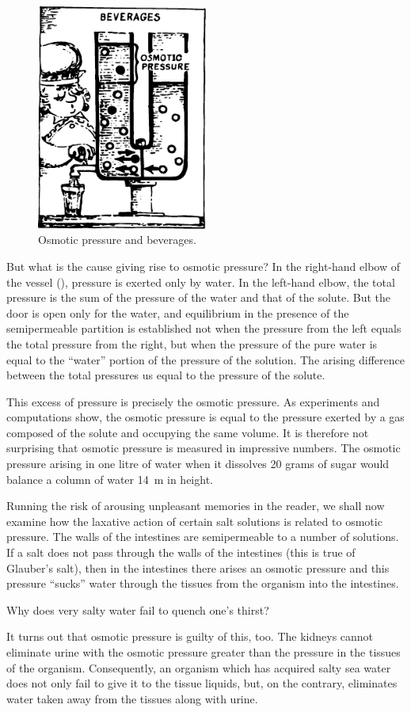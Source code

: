 \begin{figure}[!ht]
\centering
\includegraphics[width=0.5\textwidth]{figures/fig-05-02.pdf}
\caption{Osmotic pressure and beverages.}
\label{fig-5.2}
\end{figure}
But what is the cause giving rise to osmotic pressure? In the right-hand elbow of the vessel (), pres­sure is exerted only by water. In the left-hand elbow, the total pressure is the sum of the pressure of the water and that of the solute. But the door is open only for the water, and equilibrium in the presence of the semipermeable partition is established not when the pressure from the left equals the total pressure from the right, but when the pressure of the pure water is equal to the “water” portion of the pressure of the solution. The arising difference between the total pressures us equal to the pressure of the solute.

This excess of pressure is precisely the osmotic pres­sure. As experiments and computations show, the osmotic pressure is equal to the pressure exerted by a gas composed of the solute and occupying the same volume. It is therefore not surprising that osmotic pressure is measured in impressive numbers. The osmotic pressure arising in one litre of water when it dissolves 20 grams of sugar would balance a column of water \SI{14}{\meter} in height. 

Running the risk of arousing unpleasant memories in the reader, we shall now examine how the laxative ac­tion of certain salt solutions is related to osmotic pres­sure. The walls of the intestines are semipermeable to a number of solutions. If a salt does not pass through the walls of the intestines (this is true of Glauber’s salt), then in the intestines there arises an osmotic pressure and this pressure ``sucks'' water through the tissues from the
organism into the intestines.

Why does very salty water fail to quench one’s thirst?

It turns out that osmotic pressure is guilty of this, too. The kidneys cannot eliminate urine with the osmotic pressure greater than the pressure in the tissues of the organism. Consequently, an organism which has acquired salty sea water does not only fail to give it to the tis­sue liquids, but, on the contrary, eliminates water taken away from the tissues along with urine.